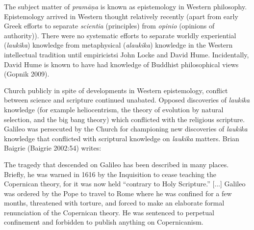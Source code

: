 The subject matter of {\sl pramāṇa} is known as epistemology in Western philosophy.  Epistemology arrived in Western thought relatively recently (apart from early Greek efforts to separate {\sl scientia} (principles) from {\sl opinio} (opinions of authority)). There were no systematic efforts to separate worldly experiential ({\sl laukika}) knowledge from metaphysical ({\sl alaukika}) knowledge in the Western intellectual tradition until empiricistsi John Locke and David Hume.  Incidentally, David Hume is known to have had knowledge of Buddhist philosophical views (Gopnik 2009).

Church publicly in spite of developments in Western epistemology, conflict between science and scripture continued unabated. Opposed discoveries of {\sl laukika} knowledge (for example heliocentrism, the theory of evolution by natural selection, and the big bang theory) which conflicted with the religious scripture.  Galileo was persecuted by the Church for championing new discoveries of {\sl laukika} knowledge that conflicted with scriptural knowledge on {\sl laukika} matters.  Brian Baigrie (Baigrie 2002:54) writes:

\newpage

\begin{myquote}
The tragedy that descended on Galileo has been described in many places. Briefly, he was warned in 1616 by the Inquisition to cease teaching the Copernican theory, for it was now held ``contrary to Holy Scripture.'' [...] Galileo was ordered by the Pope to travel to Rome where he was confined for a few months, threatened with torture, and forced to make an elaborate formal renunciation of the Copernican theory.  He was sentenced to perpetual confinement and forbidden to publish anything on Copernicanism.
\end{myquote}

